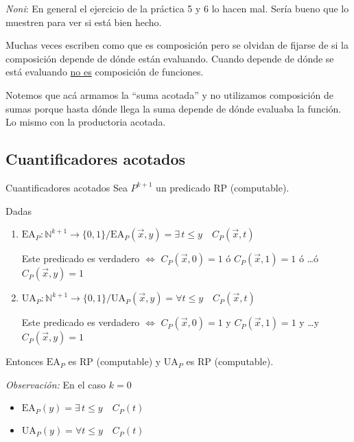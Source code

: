 \textit{Noni}: En general el ejercicio de la práctica 5 y 6 lo hacen mal.
Sería bueno que lo muestren para ver si está bien hecho.

Muchas veces escriben como que es composición pero se olvidan de fijarse de
si la composición depende de dónde están evaluando. Cuando depende de dónde
se está evaluando \underline{no es} composición de funciones.

Notemos que acá armamos la ``suma acotada'' y no utilizamos composición
de sumas porque hasta dónde llega la suma depende de dónde evaluaba la 
función. Lo mismo con la productoria acotada.

\subsection{Cuantificadores acotados}

\begin{teorema}{Cuantificadores acotados}{}
    Sea ${P}^{k+1}$ un predicado RP (computable).

    Dadas
    \begin{enumerate}
        \item {}%
            $\mathrm{EA}_P : \mathbb{N}^{k+1} \to \{0,1\} / 
            \mathrm{EA}_P (\overrightarrow{x},y) = \exists \, t \leq y
            \quad C_P (\overrightarrow{x},t)$

            Este predicado es verdadero $\iff$
            $C_P(\overrightarrow{x},0) = 1$ ó 
            $C_P(\overrightarrow{x},1) = 1$ ó 
            \dots ó
            $C_P(\overrightarrow{x},y) = 1$
        \item {}%
            $\mathrm{UA}_P : \mathbb{N}^{k+1} \to \{ 0,1 \} /
            \mathrm{UA}_P (\overrightarrow{x},y) = \forall t \leq y \quad
            C_P(\overrightarrow{x},t)$

            Este predicado es verdadero $\iff$
            $C_P(\overrightarrow{x},0) = 1$ y 
            $C_P(\overrightarrow{x},1) = 1$ y 
            \dots y
            $C_P(\overrightarrow{x},y) = 1$
    \end{enumerate}

    \medskip

    Entonces $\mathrm{EA}_P$ es RP (computable) y $\mathrm{UA}_P$ es RP
    (computable).

    \bigskip
    \textit{Observación:}
    En el caso $k=0$
    \begin{itemize}
        \item $\mathrm{EA}_P (y) = \exists \, t \leq y \quad C_P(t)$
        \item $\mathrm{UA}_P (y) = \forall t \leq y \quad C_P(t)$
    \end{itemize}
\end{teorema}

